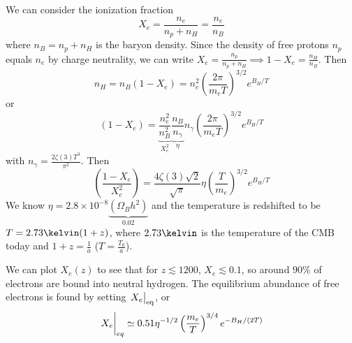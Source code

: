 \documentclass[a4paper,twoside,master.tex]{subfiles}
\begin{document}
We can consider the ionization fraction
\begin{equation}
    X_e = \frac{n_e}{n_p + n_H} = \frac{n_e}{n_B}
\end{equation}
where $ n_B = n_p + n_H $ is the baryon density. Since the density of free protons $ n_p $ equals $ n_e $ by charge neutrality, we can write $ X_e = \frac{n_p}{n_p + n_H} \implies 1 - X_e = \frac{n_H}{n_B} $. Then
\begin{equation}
    n_H = n_B(1 - X_e) = n_e^2 \left( \frac{2 \pi}{m_e T} \right)^{3/2} e^{B_H / T}
\end{equation}
or
\begin{equation}
    (1 - X_e) = \underbrace{\frac{n_e^2}{n_B^2}}_{X_e^2} \underbrace{\frac{n_B}{n_{\gamma}}}_{\eta} n_{\gamma} \left( \frac{2 \pi}{m_e T} \right)^{3/2} e^{B_H / T}
\end{equation}
with $ n_{\gamma} = \frac{2 \zeta(3) T^3}{\pi^2} $. Then
\begin{equation}
    \left( \frac{1 - X_e}{X_e^2} \right) = \frac{4 \zeta(3) \sqrt{2}}{\sqrt{\pi}} \eta \left( \frac{T}{m_e} \right)^{3/2} e^{B_H / T}
\end{equation}
We know $ \eta = 2.8 \times 10^{-8} \underbrace{(\Omega_B h^2)}_{0.02} $ and the temperature is redshifted to be $ T = 2.73\kelvin (1+z) $, where $ 2.73\kelvin $ is the temperature of the CMB today and $ 1+z = \frac{1}{a} $ ($ T = \frac{T_0}{a} $).

We can plot $ X_e(z) $ to see that for $ z \lesssim 1200 $, $ X_e \lesssim 0.1 $, so around $ 90\% $ of electrons are bound into neutral hydrogen. The equilibrium abundance of free electrons is found by setting $ \eval{X_e}_{\text{eq}} $, or
\begin{equation}
    \eval{X_e}_{eq} \simeq 0.51 \eta^{-1/2} \left( \frac{m_e}{T} \right)^{3/4} e^{-B_H / (2T)}
\end{equation}
\end{document}
